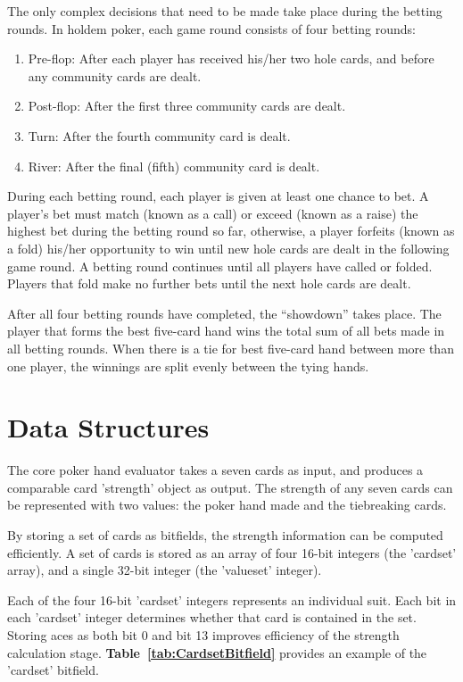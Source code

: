 The only complex decisions that need to be made take place during the betting rounds.
In holdem poker, each game round consists of four betting rounds:
\begin{enumerate}
\singlespacing
\item Pre-flop: After each player has received his/her two hole cards, and before any community cards are dealt.
\item Post-flop: After the first three community cards are dealt.
\item Turn: After the fourth community card is dealt.
\item River: After the final (fifth) community card is dealt.
\end{enumerate}

During each betting round, each player is given at least one chance to bet.
A player's bet must match (known as a call) or exceed (known as a raise) the highest bet during the betting round so far, otherwise, a player forfeits (known as a fold) his/her opportunity to win until new hole cards are dealt in the following game round.
A betting round continues until all players have called or folded.
Players that fold make no further bets until the next hole cards are dealt.

After all four betting rounds have completed, the ``showdown'' takes place.
The player that forms the best five-card hand wins the total sum of all bets made in all betting rounds.
When there is a tie for best five-card hand between more than one player, the winnings are split evenly between the tying hands.



\section{Data Structures}
\label{sec:DataStructures}

The core poker hand evaluator takes a seven cards as input, and produces a comparable card 'strength' object as output.
The strength of any seven cards can be represented with two values: the poker hand made and the tiebreaking cards.

By storing a set of cards as bitfields, the strength information can be computed efficiently.
A set of cards is stored as an array of four 16-bit integers (the 'cardset' array), and a single 32-bit integer (the 'valueset' integer).

Each of the four 16-bit 'cardset' integers represents an individual suit.
Each bit in each 'cardset' integer determines whether that card is contained in the set.
Storing aces as both bit 0 and bit 13 improves efficiency of the strength calculation stage.
\textbf{Table~\ref{tab:CardsetBitfield}} provides an example of the 'cardset' bitfield.

